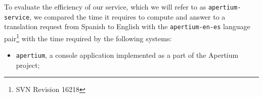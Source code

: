 \documentclass[11pt]{article}
\begin{document}
To evaluate the efficiency of our service, which we will refer to as {\tt\small apertium-service}, we compared the time it requires to compute and answer to a translation request from Spanish to English with the {\tt\small apertium-en-es} language pair\footnote{SVN Revision 16218} with the time required by the following systems:


\begin{itemize}
 \item {\tt\small apertium}, a console application implemented as a part of the Apertium project;
\end{itemize}

%
\end{document}
